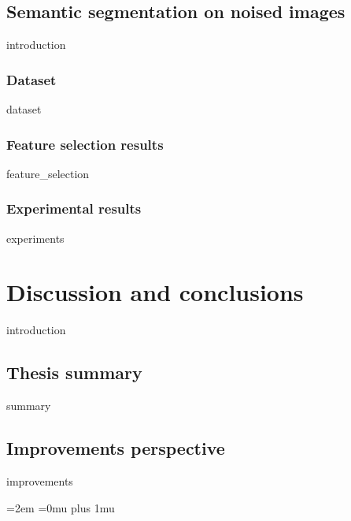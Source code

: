 \documentclass[12pt]{report}
\begin{document}
    \section{Semantic segmentation on noised images}
    {introduction} 
         \subsection{Dataset}
        {dataset}
     
        \subsection{Feature selection results}
        \label{sec:feature_selection_noise}
        {feature_selection}
        
        \subsection{Experimental results}	
        {experiments}

\chapter{Discussion and conclusions}        
    \label{chapter:conclusions}
    {introduction}
    
    \section{Thesis summary}
    {summary}
    
    \section{Improvements perspective}
    {improvements}
   



\newpage
\emergencystretch=2em
\Urlmuskip=0mu plus 1mu\relax

\printbibliography[heading=bibintoc]
\newpage
\listoffigures
\newpage
\listoftables
\newpage
\end{document}
